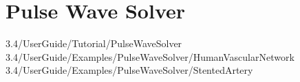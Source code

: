 \chapter{Pulse Wave Solver}

3.4/UserGuide/Tutorial/PulseWaveSolver
3.4/UserGuide/Examples/PulseWaveSolver/HumanVascularNetwork
3.4/UserGuide/Examples/PulseWaveSolver/StentedArtery
